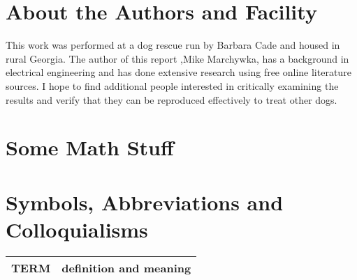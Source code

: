 \begin{mdpicomment}
\section{About the Authors and Facility}
This work was performed at a dog rescue run by Barbara Cade and
housed in rural Georgia.  The author of this report 
,Mike Marchywka,
has a background in electrical engineering and 
has done extensive research using free online literature sources.  
I hope to find additional people interested in critically 
examining the results and verify that they can be reproduced
effectively to treat other dogs.

\begin{comment}
\begin{figure}[htb] 
\centering
\mjmed{ picture commented out to save space in drafts...  } 
\caption{ 
 }
\end{figure}

\end{comment}

\section{ Some Math Stuff }



\section{Symbols, Abbreviations and Colloquialisms}

\begin{comment}
\end{comment}


\noindent
\begin{tabular}{@{}ll}
TERM & definition and meaning   \\
\hline
\end{tabular} %


\end{mdpicomment}
